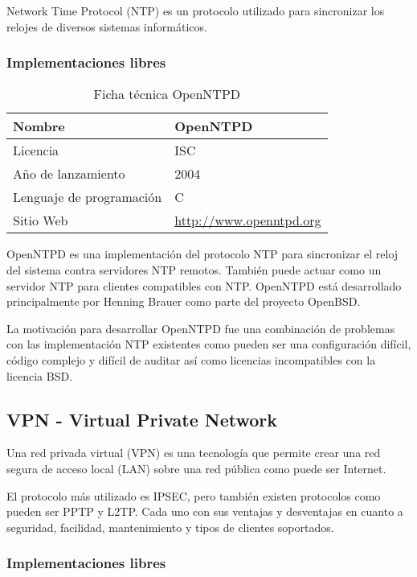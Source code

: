 Network Time Protocol (NTP) es un protocolo utilizado para sincronizar los relojes de diversos sistemas informáticos.

\subsubsection {Implementaciones libres}

\begin{table}[H]
\begin{tabular}{|l|l|}
\hline
Nombre                   & OpenNTPD                       \\ \hline
Licencia                 & ISC                            \\ \hline
Año de lanzamiento       & 2004                           \\ \hline
Lenguaje de programación & C                              \\ \hline
Sitio Web                & \url{http://www.openntpd.org}  \\ \hline
\end{tabular}
\caption{Ficha técnica OpenNTPD}
\end{table}

OpenNTPD es una implementación del protocolo NTP para sincronizar el reloj del sistema contra servidores NTP remotos. También puede actuar como un servidor NTP para clientes compatibles con NTP. OpenNTPD está desarrollado principalmente por Henning Brauer como parte del proyecto OpenBSD.

\bigskip
La motivación para desarrollar OpenNTPD fue una combinación de problemas con las implementación NTP existentes como pueden ser una configuración difícil, código complejo y difícil de auditar así como licencias incompatibles con la licencia BSD.


\subsection {VPN - Virtual Private Network}

Una red privada virtual (VPN) es una tecnología que permite crear una red segura de acceso local (LAN) sobre una red pública como puede ser Internet.

\bigskip
El protocolo más utilizado es IPSEC, pero también existen protocolos como pueden ser PPTP y L2TP. Cada uno con sus ventajas y desventajas en cuanto a seguridad, facilidad, mantenimiento y tipos de clientes soportados.

\subsubsection {Implementaciones libres}


